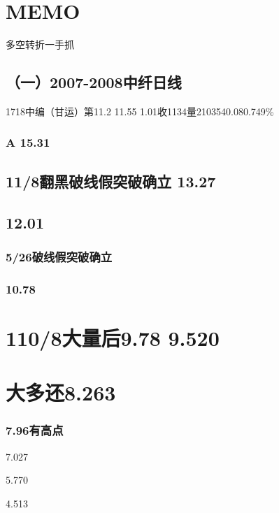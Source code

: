 \documentclass{article}
\begin{document}
\section{MEMO}

\clearpage

多空转折一手抓

\subsection{（一）2007-2008中纤日线}

1718中编（甘运）第11.2 11.55 1.01收1134量2103540.080.749\%

\subsubsection{A 15.31}

\subsection{11/8翻黑破线假突破确立 13.27}

\subsection{12.01}

\subsubsection{5/26破线假突破确立}

\subsubsection{10.78}

\section{110/8大量后9.78 9.520}

\section{大多还8.263}

\subsubsection{7.96有高点}

7.027

5.770

4.513
\end{document}
